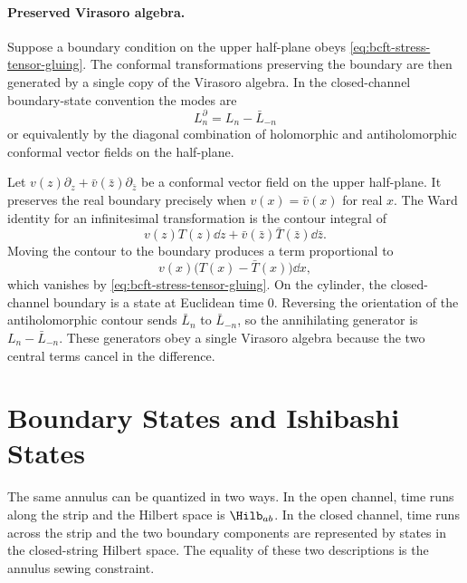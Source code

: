 \paragraph{Preserved Virasoro algebra.}
Suppose a boundary condition on the upper half-plane obeys
\eqref{eq:bcft-stress-tensor-gluing}.  The conformal transformations
preserving the boundary are then generated by a single copy of the Virasoro
algebra.  In the closed-channel boundary-state convention the modes are
\begin{equation}
  L_n^{\partial}
  =
  L_n-\bar L_{-n}
  \label{eq:bcft-boundary-virasoro-generator}
\end{equation}
or equivalently by the diagonal combination of holomorphic and
antiholomorphic conformal vector fields on the half-plane.

Let \(v(z)\partial_z+\bar v(\bar z)\partial_{\bar z}\) be a conformal vector
field on the upper half-plane.  It preserves the real boundary precisely when
\(v(x)=\bar v(x)\) for real \(x\).  The Ward identity for an infinitesimal
transformation is the contour integral of
\[
  v(z)T(z)\dd z+\bar v(\bar z)\bar T(\bar z)\dd\bar z .
\]
Moving the contour to the boundary produces a term proportional to
\[
  v(x)\bigl(T(x)-\bar T(x)\bigr)\dd x,
\]
which vanishes by \eqref{eq:bcft-stress-tensor-gluing}.  On the cylinder,
the closed-channel boundary is a state at Euclidean time \(0\).  Reversing
the orientation of the antiholomorphic contour sends \(\bar L_n\) to
\(\bar L_{-n}\), so the annihilating generator is
\(L_n-\bar L_{-n}\).  These generators obey a single Virasoro algebra
because the two central terms cancel in the difference.

\section{Boundary States and Ishibashi States}

The same annulus can be quantized in two ways.  In the open channel, time
runs along the strip and the Hilbert space is \(\Hilb_{ab}\).  In the closed
channel, time runs across the strip and the two boundary components are
represented by states in the closed-string Hilbert space.  The equality of
these two descriptions is the annulus sewing constraint.

